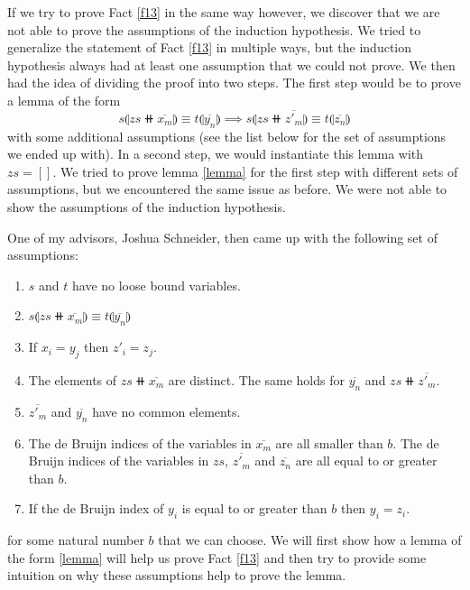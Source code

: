 If we try to prove Fact \ref{f13} in the same way however, we discover that we are not able to prove the assumptions of the induction hypothesis. We tried to generalize the statement of Fact \ref{f13} in multiple ways, but the induction hypothesis always had at least one assumption that we could not prove. We then had the idea of dividing the proof into two steps. The first step would be to prove a lemma of the form
\begin{equation}
	\label{lemma}
s \llparenthesis zs \doubleplus \overline{x_m} \rrparenthesis \equiv t \llparenthesis \overline{y_n} \rrparenthesis \implies s \llparenthesis zs \doubleplus \overline{z'_m} \rrparenthesis \equiv t \llparenthesis \overline{z_n} \rrparenthesis
\end{equation}
with some additional assumptions (see the list below for the set of assumptions we ended up with). In a second step, we would instantiate this lemma with $zs = []$. We tried to prove lemma \ref{lemma} for the first step with different sets of assumptions, but we encountered the same issue as  before. We were not able to show the assumptions of the induction hypothesis.

One of my advisors, Joshua Schneider, then came up with the following set of assumptions:

\begin{enumerate}
	\item $s$ and $t$ have no loose bound variables.
	\item $s \llparenthesis zs \doubleplus \overline{x_m} \rrparenthesis \equiv t \llparenthesis \overline{y_n} \rrparenthesis$
	\item If $x_i = y_j$ then $z'_i = z_j$.
	\item The elements of $zs \doubleplus \overline{x_m}$ are distinct. The same holds for $\overline{y_n}$ and $zs \doubleplus \overline{z'_m}$.
	\item $\overline{z'_m}$ and $\overline{y_n}$ have no common elements.
	\item The de Bruijn indices of the variables in $\overline{x_m}$ are all smaller than $b$. The de Bruijn indices of the variables in $zs$, $\overline{z'_m}$ and $\overline{z_n}$ are all equal to or greater than $b$.
	\item If the de Bruijn index of $y_i$ is equal to or greater than $b$ then $y_i = z_i$.
\end{enumerate}

for some natural number $b$ that we can choose. We will first show how a lemma of the form \ref{lemma} will help us prove Fact \ref{f13} and then try to provide some intuition on why these assumptions help to prove the lemma.


